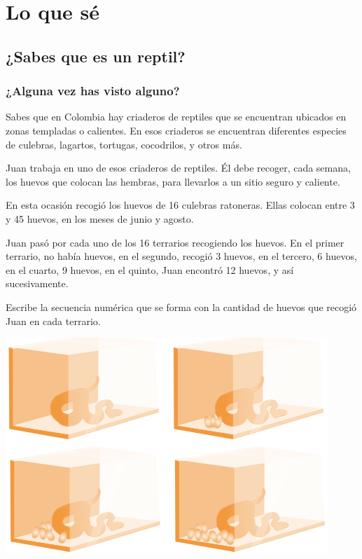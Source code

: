 \documentclass[10pt,twoside]{article}
\begin{document}
\section*{Lo que s\'{e}}
\subsection*{¿Sabes que es un reptil?}
\subsubsection*{¿Alguna vez has visto alguno?}
Sabes que en Colombia hay criaderos de reptiles que se
encuentran ubicados en zonas templadas o calientes. En esos
criaderos se encuentran diferentes especies de culebras, lagartos, tortugas, cocodrilos, y otros más.
\begin{itemize}
\item Juan trabaja en uno de esos criaderos de reptiles. Él debe recoger, cada semana, los huevos que colocan las hembras, para llevarlos a un sitio seguro y caliente.
\item En esta ocasión recogió los huevos de 16 culebras ratoneras. Ellas colocan entre 3 y 45 huevos, en los meses de junio y agosto.

\begin{minipage}{.35\textwidth}
\item Juan pasó por cada uno de los 16 terrarios recogiendo los huevos. En el primer terrario, no había huevos, en el segundo, recogió 3 huevos, en el tercero, 6 huevos, en el cuarto, 9 huevos, en el quinto, Juan encontró 12 huevos, y así sucesivamente.
\item Escribe la secuencia numérica que se forma con la cantidad de huevos que recogió Juan en cada terrario.
\end{minipage}\hfill
\begin{minipage}{.65\textwidth}
\includegraphics[scale=.75]{Images/culebras.png} 
\end{minipage}
\end{itemize}
\end{document}
